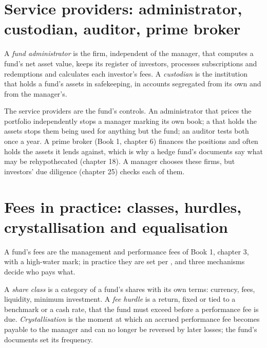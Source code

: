\section{Service providers: administrator, custodian, auditor, prime broker}

\begin{definition}\label{def:fm:the-asset-manager-and-the-fund:admin}
A \emph{fund administrator} is the firm, independent of the manager, that computes a fund's net asset value, keeps
its register of investors, processes subscriptions and redemptions and calculates each investor's fees. A \emph{custodian} is
the institution that holds a fund's assets in safekeeping, in accounts segregated from its own and from the manager's.
\end{definition}

The service providers are the fund's controls. An administrator that prices the portfolio independently stops a manager marking its own book; a
 that holds the assets stops them being used for anything but the fund; an auditor tests both once a year. A prime broker (Book 1,
chapter 6) finances the positions and often holds the assets it lends against, which is why a hedge fund's documents say what may be
rehypothecated (chapter 18). A manager chooses these firms, but investors' due diligence (chapter 25) checks each of them.

\section{Fees in practice: classes, hurdles, crystallisation and equalisation}

A fund's fees are the management and performance fees of Book 1, chapter 3, with a high-water mark; in practice they are set per ,
and three mechanisms decide who pays what.

\begin{definition}\label{def:fm:the-asset-manager-and-the-fund:class}
A \emph{share class} is a category of a fund's shares with its own terms: currency, fees, liquidity, minimum investment. A
\emph{fee hurdle} is a return, fixed or tied to a benchmark or a cash rate, that the fund must exceed before a performance fee
is due. \emph{Crystallisation} is the moment at which an accrued performance fee becomes payable to the manager and can no
longer be reversed by later losses; the fund's documents set its frequency.
\end{definition}

